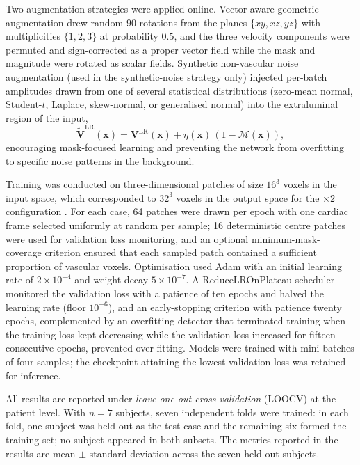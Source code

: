\documentclass[11pt]{article}
\begin{document}
Two augmentation strategies were applied online. Vector-aware geometric
augmentation drew random 90\textdegree{} rotations from the planes
$\{xy,xz,yz\}$ with multiplicities $\{1,2,3\}$ at probability $0.5$,
and the three velocity components were permuted and sign-corrected as
a proper vector field while the mask and magnitude were rotated as
scalar fields. Synthetic non-vascular noise augmentation (used in the
synthetic-noise strategy only) injected per-batch amplitudes drawn
from one of several statistical distributions (zero-mean normal,
Student-$t$, Laplace, skew-normal, or generalised normal) into the
extraluminal region of the input,
\begin{equation}
    \tilde{\mathbf{V}}^{\mathrm{LR}}(\mathbf{x})
    = \mathbf{V}^{\mathrm{LR}}(\mathbf{x})
      + \eta(\mathbf{x})\,(1-\mathcal{M}(\mathbf{x})),
\end{equation}
encouraging mask-focused learning and preventing the network from
overfitting to specific noise patterns in the background.

Training was conducted on three-dimensional patches of size $16^{3}$
voxels in the input space, which corresponded to $32^{3}$ voxels in
the output space for the $\times 2$ configuration
\cite{peiffer2024patch}. For each case, 64 patches were drawn per epoch
with one cardiac frame selected uniformly at random per sample; 16
deterministic centre patches were used for validation loss monitoring,
and an optional minimum-mask-coverage criterion ensured that each
sampled patch contained a sufficient proportion of vascular voxels.
Optimisation used Adam \cite{kingma2015adam} with an initial learning
rate of $2{\times}10^{-4}$ and weight decay $5{\times}10^{-7}$. A
ReduceLROnPlateau scheduler monitored the validation loss with a
patience of ten epochs and halved the learning rate (floor $10^{-6}$),
and an early-stopping criterion with patience twenty epochs,
complemented by an overfitting detector that terminated training when
the training loss kept decreasing while the validation loss increased
for fifteen consecutive epochs, prevented over-fitting. Models were
trained with mini-batches of four samples; the checkpoint attaining the
lowest validation loss was retained for inference.

All results are reported under \emph{leave-one-out cross-validation}
(LOOCV) at the patient level. With $n=7$ subjects, seven independent
folds were trained: in each fold, one subject was held out as the test
case and the remaining six formed the training set; no subject appeared
in both subsets. The metrics reported in the results are mean $\pm$
standard deviation across the seven held-out subjects.
\end{document}
